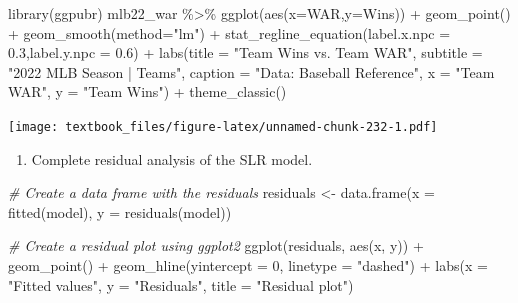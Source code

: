 \documentclass[
  11pt,
]{book}
\newenvironment{Shaded}{\begin{snugshade}}{\end{snugshade}}
\newcommand{\AttributeTok}[1]{\textcolor[rgb]{0.77,0.63,0.00}{#1}}
\newcommand{\CommentTok}[1]{\textcolor[rgb]{0.56,0.35,0.01}{\textit{#1}}}
\newcommand{\DecValTok}[1]{\textcolor[rgb]{0.00,0.00,0.81}{#1}}
\newcommand{\FloatTok}[1]{\textcolor[rgb]{0.00,0.00,0.81}{#1}}
\newcommand{\FunctionTok}[1]{\textcolor[rgb]{0.00,0.00,0.00}{#1}}
\newcommand{\NormalTok}[1]{#1}
\newcommand{\OtherTok}[1]{\textcolor[rgb]{0.56,0.35,0.01}{#1}}
\newcommand{\SpecialCharTok}[1]{\textcolor[rgb]{0.00,0.00,0.00}{#1}}
\newcommand{\StringTok}[1]{\textcolor[rgb]{0.31,0.60,0.02}{#1}}
\providecommand{\tightlist}{%
  \setlength{\itemsep}{0pt}\setlength{\parskip}{0pt}}
\theoremstyle{definition}
\theoremstyle{definition}
\theoremstyle{definition}
\theoremstyle{definition}
\theoremstyle{remark}
\begin{document}
\begin{Shaded}
\begin{Highlighting}[]
\FunctionTok{library}\NormalTok{(ggpubr)}
\NormalTok{mlb22\_war }\SpecialCharTok{\%\textgreater{}\%} \FunctionTok{ggplot}\NormalTok{(}\FunctionTok{aes}\NormalTok{(}\AttributeTok{x=}\NormalTok{WAR,}\AttributeTok{y=}\NormalTok{Wins)) }\SpecialCharTok{+}
  \FunctionTok{geom\_point}\NormalTok{() }\SpecialCharTok{+}
  \FunctionTok{geom\_smooth}\NormalTok{(}\AttributeTok{method=}\StringTok{"lm"}\NormalTok{) }\SpecialCharTok{+} 
  \FunctionTok{stat\_regline\_equation}\NormalTok{(}\AttributeTok{label.x.npc =} \FloatTok{0.3}\NormalTok{,}\AttributeTok{label.y.npc =} \FloatTok{0.6}\NormalTok{) }\SpecialCharTok{+}
  \FunctionTok{labs}\NormalTok{(}\AttributeTok{title =} \StringTok{"Team Wins vs. Team WAR"}\NormalTok{,}
       \AttributeTok{subtitle =} \StringTok{"2022 MLB Season | Teams"}\NormalTok{,}
       \AttributeTok{caption =} \StringTok{"Data: Baseball Reference"}\NormalTok{, }
       \AttributeTok{x =} \StringTok{"Team WAR"}\NormalTok{,}
       \AttributeTok{y =} \StringTok{"Team Wins"}\NormalTok{) }\SpecialCharTok{+}
  \FunctionTok{theme\_classic}\NormalTok{()}
\end{Highlighting}
\end{Shaded}

\texttt{[image: textbook\_files/figure-latex/unnamed-chunk-232-1.pdf]}
\newpage

\begin{enumerate}
\def\labelenumi{(\alph{enumi})}
\setcounter{enumi}{3}
\tightlist
\item
  Complete residual analysis of the SLR model.
\end{enumerate}

\begin{Shaded}
\begin{Highlighting}[]
\CommentTok{\# Create a data frame with the residuals}
\NormalTok{residuals }\OtherTok{\textless{}{-}} \FunctionTok{data.frame}\NormalTok{(}\AttributeTok{x =} \FunctionTok{fitted}\NormalTok{(model), }\AttributeTok{y =} \FunctionTok{residuals}\NormalTok{(model))}

\CommentTok{\# Create a residual plot using ggplot2}
\FunctionTok{ggplot}\NormalTok{(residuals, }\FunctionTok{aes}\NormalTok{(x, y)) }\SpecialCharTok{+}
  \FunctionTok{geom\_point}\NormalTok{() }\SpecialCharTok{+}
  \FunctionTok{geom\_hline}\NormalTok{(}\AttributeTok{yintercept =} \DecValTok{0}\NormalTok{, }\AttributeTok{linetype =} \StringTok{"dashed"}\NormalTok{) }\SpecialCharTok{+}
  \FunctionTok{labs}\NormalTok{(}\AttributeTok{x =} \StringTok{"Fitted values"}\NormalTok{, }\AttributeTok{y =} \StringTok{"Residuals"}\NormalTok{, }\AttributeTok{title =} \StringTok{"Residual plot"}\NormalTok{)}
\end{Highlighting}
\end{Shaded}
\end{document}
